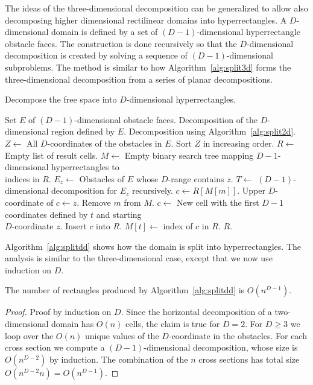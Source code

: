 \documentclass[english,gradu]{tktltiki2018}
\begin{document}
The ideas of the three-dimensional decomposition can be generalized to allow also decomposing higher dimensional rectilinear domains into hyperrectangles.
A $D$-dimensional domain is defined by a set of $(D-1)$-dimensional hyperrectangle obstacle faces.
The construction is done recursively so that the $D$-dimensional decomposition is created by solving a sequence of $(D-1)$-dimensional subproblems.
The method is similar to how Algorithm~\ref{alg:split3d} forms the three-dimensional decomposition from a series of planar decompositions.

\begin{algorithm}
\caption{Decompose the free space into $D$-dimensional hyperrectangles.}
\label{alg:splitdd}
\begin{algorithmic}
\Require Set $E$ of $(D-1)$-dimensional obstacle faces.
\Output Decomposition of the $D$-dimensional region defined by $E$.
	\State \Return Decomposition using Algorithm~\ref{alg:split2d}.
\EndIf
\State $Z\gets$ All $D$-coordinates of the obstacles in $E$.
\State Sort $Z$ in increasing order.
\State $R\gets$ Empty list of result cells.
\State $M\gets$ Empty binary search tree mapping $D-1$-dimensional hyperrectangles to \\
	\hspace{10mm} indices in $R$.
	\State $E_z\gets$ Obstacles of $E$ whose $D$-range contains $z$.
	\State $T\gets$ $(D-1)$-dimensional decomposition for $E_z$ recursively.
		\State $c\gets R[M[m]]$.
		\State Upper $D$-coordinate of $c\gets z$.
		\State Remove $m$ from $M$.
	\EndFor
		\State $c\gets$ New cell with the first $D-1$ coordinates defined by $t$ and starting \\
			\hspace{20mm} $D$-coordinate $z$.
		\State Insert $c$ into $R$.
		\State $M[t]\gets$ index of $c$ in $R$.
	\EndFor
\EndFor
\State \Return $R$.
\end{algorithmic}
\end{algorithm}

Algorithm~\ref{alg:splitdd} shows how the domain is split into hyperrectangles.
The analysis is similar to the three-dimensional case, except that we now use induction on $D$.

\begin{lem}\label{lem:splitddcells}The number of rectangles produced by Algorithm~\ref{alg:splitdd} is $O(n^{D-1})$.\end{lem}
\begin{proof}
Proof by induction on $D$.
Since the horizontal decomposition of a two-dimensional domain has $O(n)$ cells, the claim is true for $D=2$.
For $D\ge 3$ we loop over the $O(n)$ unique values of the $D$-coordinate in the obstacles.
For each cross section we compute a $(D-1)$-dimensional decomposition, whose size is $O(n^{D-2})$ by induction.
The combination of the $n$ cross sections has total size $O(n^{D-2}n)=O(n^{D-1})$.
\end{proof}
\end{document}
